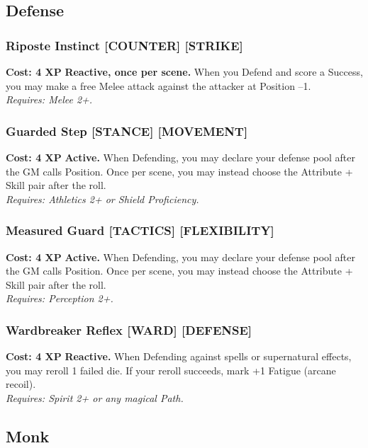 \subsection*{Defense}
\label{sec:major-defense}

\subsubsection*{Riposte Instinct \textnormal{[COUNTER] [STRIKE]}}
\label{talent:riposte-instinct}
\textbf{Cost: 4 XP} \textbf{Reactive, once per scene.} When you Defend and score a Success, you may make a free Melee attack against the attacker at Position –1. \\
\textit{Requires: Melee 2+.}

\subsubsection*{Guarded Step \textnormal{[STANCE] [MOVEMENT]}}
\label{talent:guarded-step}
\textbf{Cost: 4 XP} \textbf{Active.} When Defending, you may declare your defense pool after the GM calls Position. Once per scene, you may instead choose the Attribute + Skill pair after the roll. \\
\textit{Requires: Athletics 2+ or Shield Proficiency.}

\subsubsection*{Measured Guard \textnormal{[TACTICS] [FLEXIBILITY]}}
\label{talent:measured-guard}
\textbf{Cost: 4 XP} \textbf{Active.} When Defending, you may declare your defense pool after the GM calls Position. Once per scene, you may instead choose the Attribute + Skill pair after the roll. \\
\textit{Requires: Perception 2+.}

\subsubsection*{Wardbreaker Reflex \textnormal{[WARD] [DEFENSE]}}
\label{talent:wardbreaker-reflex}
\textbf{Cost: 4 XP} \textbf{Reactive.} When Defending against spells or supernatural effects, you may reroll 1 failed die. If your reroll succeeds, mark +1 Fatigue (arcane recoil). \\
\textit{Requires: Spirit 2+ or any magical Path.}

\subsection*{Monk}
\label{sec:major-monk}

